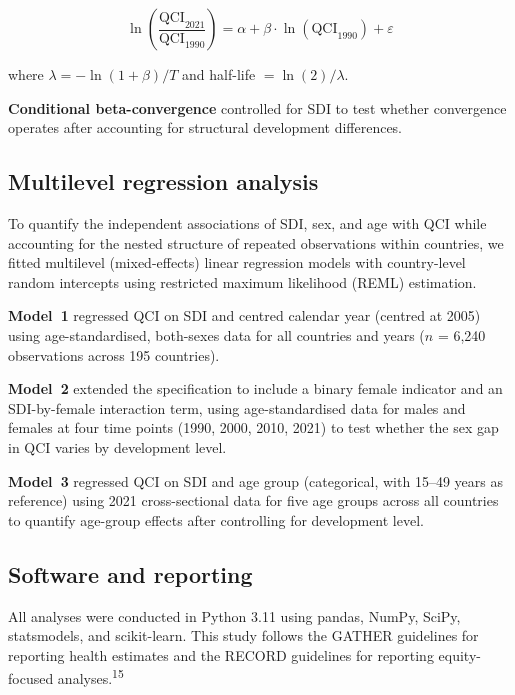 \documentclass[12pt]{article}
\begin{document}
\begin{equation}
\ln\!\left(\frac{\text{QCI}_{2021}}{\text{QCI}_{1990}}\right) = \alpha + \beta \cdot \ln(\text{QCI}_{1990}) + \varepsilon
\end{equation}

where $\lambda = -\ln(1 + \beta) / T$ and half-life $= \ln(2) / \lambda$.

\textbf{Conditional beta-convergence} controlled for SDI to test whether convergence operates after accounting for structural development differences.

\subsection{Multilevel regression analysis}

To quantify the independent associations of SDI, sex, and age with QCI while accounting for the nested structure of repeated observations within countries, we fitted multilevel (mixed-effects) linear regression models with country-level random intercepts using restricted maximum likelihood (REML) estimation.

\textbf{Model~1} regressed QCI on SDI and centred calendar year (centred at 2005) using age-standardised, both-sexes data for all countries and years ($n$ = 6{,}240 observations across 195 countries).

\textbf{Model~2} extended the specification to include a binary female indicator and an SDI-by-female interaction term, using age-standardised data for males and females at four time points (1990, 2000, 2010, 2021) to test whether the sex gap in QCI varies by development level.

\textbf{Model~3} regressed QCI on SDI and age group (categorical, with 15--49 years as reference) using 2021 cross-sectional data for five age groups across all countries to quantify age-group effects after controlling for development level.

\subsection{Software and reporting}

All analyses were conducted in Python 3.11 using pandas, NumPy, SciPy, statsmodels, and scikit-learn. This study follows the GATHER guidelines for reporting health estimates and the RECORD guidelines for reporting equity-focused analyses.\textsuperscript{15}

\end{document}
